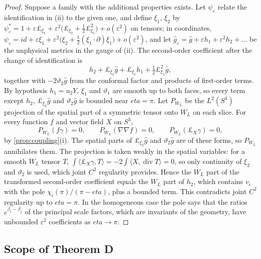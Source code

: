 \documentclass[11pt]{article}
\theoremstyle{canonmath}
\theoremstyle{canonpostulate}
\theoremstyle{canonproposition}
\theoremstyle{canonmath}
\theoremstyle{canonproposition}
\def\mathrm#1{#1}%
\def\mathcal#1{#1}%
\def\eta{eta}%
\begin{document}
\begin{proof}
Suppose a family with the additional properties exists. Let $\psi_\varepsilon$ relate the identification in (ii) to the given one, and define $\xi_1$, $\xi_2$ by $\psi_\varepsilon^* = 1 + \varepsilon\pounds_{\xi_1} + \varepsilon^2\bigl(\pounds_{\xi_2} + \tfrac12\pounds_{\xi_1}^2\bigr) + o(\varepsilon^2)$ on tensors; in coordinates, $\psi_\varepsilon = \mathrm{id} + \varepsilon\xi_1 + \varepsilon^2\bigl(\xi_2 + \tfrac12(\xi_1\cdot\partial)\xi_1\bigr) + o(\varepsilon^2)$, and let $\hat g_\varepsilon = \hat g + \varepsilon h_1 + \varepsilon^2h_2 + \dots$ be the unphysical metrics in the gauge of (ii). The second-order coefficient after the change of identification is
\[
h_2 + \pounds_{\xi_2}\hat g + \pounds_{\xi_1}h_1 + \tfrac12\pounds_{\xi_1}^2\hat g,
\]
together with $-2\vartheta_2\hat g$ from the conformal factor and products of first-order terms. By hypothesis $h_1 = u_2Y$, $\xi_1$ and $\vartheta_1$ are smooth up to both faces, so every term except $h_2$, $\pounds_{\xi_2}\hat g$ and $\vartheta_2\hat g$ is bounded near $\eta=\pi$. Let $\mathcal P_{W_L}$ be the $L^2(S^3)$ projection of the spatial part of a symmetric tensor onto $W_L$ on each slice. For every function $f$ and vector field $X$ on $S^3$,
\[
\mathcal P_{W_L}(f\gamma) = 0, \qquad \mathcal P_{W_L}(\nabla\nabla f) = 0, \qquad \mathcal P_{W_L}(\pounds_X\gamma) = 0,
\]
by \cref{prop:coupling}(i). The spatial parts of $\pounds_{\xi_2}\hat g$ and $\vartheta_2\hat g$ are of these forms, so $\mathcal P_{W_L}$ annihilates them. The projection is taken weakly in the spatial variables: for a smooth $W_L$ tensor $T$, $\int\langle\pounds_X\gamma,T\rangle = -2\int\langle X,\operatorname{div}T\rangle = 0$, so only continuity of $\xi_2$ and $\vartheta_2$ is used, which joint $C^2$ regularity provides. Hence the $W_L$ part of the transformed second-order coefficient equals the $W_L$ part of $h_2$, which contains $v_i$ with the pole $\chi_i(\pi)/(\pi-\eta)$, plus a bounded term. This contradicts joint $C^2$ regularity up to $\eta = \pi$. In the homogeneous case the pole says that the ratios $e^{\beta_i-\beta_j}$ of the principal scale factors, which are invariants of the geometry, have unbounded $\varepsilon^2$ coefficients as $\eta\to\pi$.
\end{proof}

\subsection{Scope of Theorem D}
\end{document}
